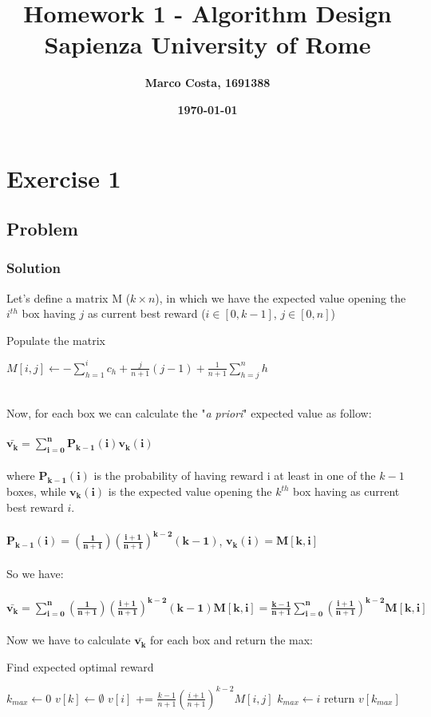 \documentclass[11pt]{article}
\title{\textbf{Homework 1 - Algorithm Design} \\ \bigskip \large \textbf{Sapienza University of Rome}}
\date{\textbf{\today}}
\author{\textbf{Marco Costa, 1691388}}
\begin{document}
\maketitle
\newpage

\section*{Exercise 1}
\subsection*{Problem}
\subsubsection*{Solution}
Let's define a matrix M ($k \times n$), in which we have the expected value opening the $i^{th}$ box having $j$ as current best reward ($i \in [0, k-1]$, $j \in [0, n]$)
\begin{algorithm}
	\caption{Populate the matrix}\label{euclid}
	\begin{algorithmic}[1]
		\State $M[i,j] \gets -\sum\limits_{h=1}^i c_h + \frac{j}{n+1}(j-1) + \frac{1}{n+1}\sum\limits_{h=j}^n h$
		\EndFor		
		\EndFor
	\end{algorithmic}
\end{algorithm}\\
Now, for each box we can calculate the "\textit{a priori}" expected value as follow: \\ \\
$\mathbf{\bar{v_k} = \sum\limits_{i=0}^n P_{k-1}(i)v_k(i)}$ \\ \\
where $\mathbf{P_{k-1}(i)}$ is the probability of having reward i at least in one of the $\mathit{k-1}$ boxes, while $\mathbf{v_k(i)}$ is the expected value opening the $\mathit{k^{th}}$ box having as current best reward $\mathit{i}$. \\ \\
$\mathbf{P_{k-1}(i) = (\frac{1}{n+1})(\frac{i+1}{n+1})^{k-2}(k-1)}$, \qquad $\mathbf{v_k(i) = M[k,i]}$ \\ \\
So we have: \\ \\
$\mathbf{\bar{v_k} = \sum\limits_{i=0}^n (\frac{1}{n+1})(\frac{i+1}{n+1})^{k-2}(k-1)M[k,i] = \frac{k-1}{n+1} \sum\limits_{i=0}^n (\frac{i+1}{n+1})^{k-2}M[k,i]}$ \\ \\
Now we have to calculate $\mathbf{\bar{v_k}}$ for each box and return the max:
\begin{algorithm}
	\caption{Find expected optimal reward}\label{euclid}
	\begin{algorithmic}[1]
		\State $k_{max} \gets 0$
		\State $v[k] \gets \emptyset$
		\State $v[i]$ += $\frac{k-1}{n+1}(\frac{i+1}{n+1})^{k-2}M[i,j]$
		\EndFor
		\State $k_{max} \gets i$
		\EndIf	
		\EndFor
		\State return $v[k_{max}]$
	\end{algorithmic}
\end{algorithm}\\
\newpage
\end{document}
